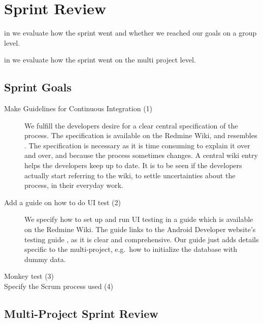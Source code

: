 \chapter{Sprint Review}\label{chap:sprint3_end}

\begin{chapterorganization}
  \item in  we evaluate how the sprint went and whether we reached our goals on a group level.
  \item in  we evaluate how the sprint went on the multi project level.
\end{chapterorganization}

\section{Sprint Goals}\label{sec:s3_goals}
\begin{description}
    \item[Make Guidelines for Continuous Integration (1)] We fulfill the developers desire for a clear central specification of the process. The specification is available on the Redmine Wiki, and resembles . The specification is necessary as it is time consuming to explain it over and over, and because the process sometimes changes. A central wiki entry helps the developers keep up to date. It is to be seen if the developers actually start referring to the wiki, to settle uncertainties about the process, in their everyday work. 
    \item[Add a guide on how to do UI test (2)] We specify how to set up and run UI testing in a guide which is available on the Redmine Wiki. The guide links to the Android Developer website's testing guide \parencite{AndroidUnit}, as it is clear and comprehensive. Our guide just adds details specific to the multi-project, e.g.\ how to initialize the database with dummy data.  
    \item[Monkey test (3)] 
    \item[Specify the Scrum process used (4)]
\end{description}

\section{Multi-Project Sprint Review}\label{sec:s3_multiprj_review}
\dummy